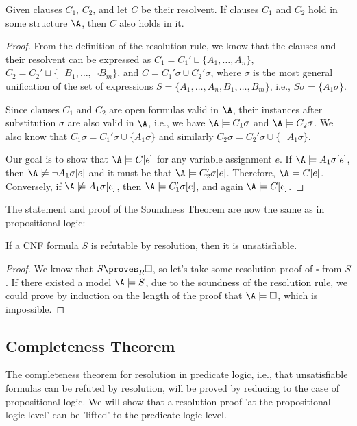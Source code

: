 \begin{proposition}
Given clauses $C_1$, $C_2$, and let $C$ be their resolvent. If clauses $C_1$ and $C_2$ hold in some structure $\A$, then $C$ also holds in it.
\end{proposition}
\begin{proof}
From the definition of the resolution rule, we know that the clauses and their resolvent can be expressed as $C_1=C_1'\sqcup \{A_1,\dots,A_n\}$, $C_2=C_2'\sqcup \{\neg B_1,\dots,\neg B_m\}$, and $C=C_1'\sigma \cup C_2'\sigma$, where $\sigma$ is the most general unification of the set of expressions $S=\{A_1,\dots,A_n,B_1,\dots,B_m\}$, i.e., $S\sigma=\{A_1\sigma\}$.

Since clauses $C_1$ and $C_2$ are open formulas valid in $\A$, their instances after substitution $\sigma$ are also valid in $\A$, i.e., we have $\A\models C_1\sigma$ and $\A\models C_2\sigma$. We also know that $C_1\sigma=C_1'\sigma \cup \{A_1\sigma\}$ and similarly $C_2\sigma=C_2'\sigma \cup \{\neg A_1\sigma\}$.

Our goal is to show that $\A\models C[e]$ for any variable assignment $e$. If $\A\models A_1\sigma[e]$, then $\A\not\models\neg A_1\sigma[e]$ and it must be that $\A\models C_2'\sigma[e]$. Therefore, $\A\models C[e]$. Conversely, if $\A\not\models A_1\sigma[e]$, then $\A\models C_1'\sigma[e]$, and again $\A\models C[e]$.
\end{proof}

The statement and proof of the Soundness Theorem are now the same as in propositional logic:

\begin{theorem}\label{theorem:soundness-of-predicate-resolution}
    If a CNF formula $S$ is refutable by resolution, then it is unsatisfiable.
\end{theorem}
\begin{proof}
    We know that $S\proves_R\square$, so let's take some resolution proof of $\square$ from $S$. If there existed a model $\A\models S$, due to the soundness of the resolution rule, we could prove by induction on the length of the proof that $\A\models\square$, which is impossible.
\end{proof}

\subsection{Completeness Theorem}

The completeness theorem for resolution in predicate logic, i.e., that unsatisfiable formulas can be refuted by resolution, will be proved by reducing to the case of propositional logic. We will show that a resolution proof 'at the propositional logic level' can be 'lifted' to the predicate logic level.

